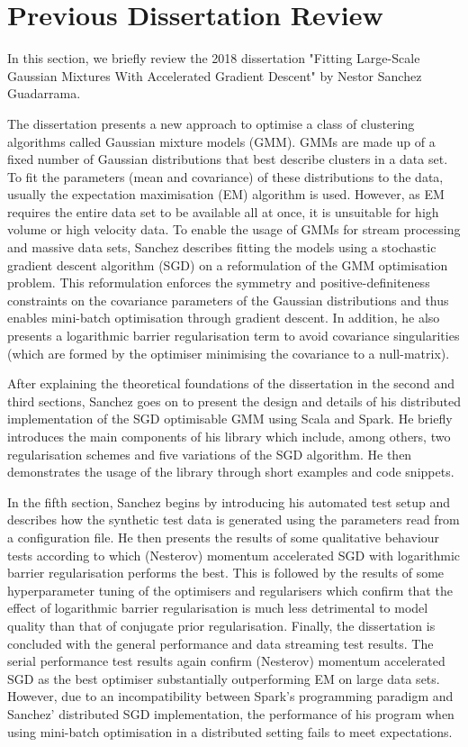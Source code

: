 \documentclass{article}
\begin{document}
\section{Previous Dissertation Review}

In this section, we briefly review the 2018 dissertation "Fitting Large-Scale Gaussian Mixtures With Accelerated Gradient Descent" \cite{sanchez2018} by Nestor Sanchez Guadarrama.

The dissertation presents a new approach to optimise a class of clustering algorithms called Gaussian mixture models (GMM). GMMs are made up of a fixed number of Gaussian distributions that best describe clusters in a data set. To fit the parameters (mean and covariance) of these distributions to the data, usually the expectation maximisation (EM) algorithm is used. However, as EM requires the entire data set to be available all at once, it is unsuitable for high volume or high velocity data. To enable the usage of GMMs for stream processing and massive data sets, Sanchez describes fitting the models using a stochastic gradient descent algorithm (SGD) on a reformulation of the GMM optimisation problem. This reformulation enforces the symmetry and positive-definiteness constraints on the covariance parameters of the Gaussian distributions and thus enables mini-batch optimisation through gradient descent. In addition, he also presents a logarithmic barrier regularisation term to avoid covariance singularities (which are formed by the optimiser minimising the covariance to a null-matrix).

After explaining the theoretical foundations of the dissertation in the second and third sections, Sanchez goes on to present the design and details of his distributed implementation of the SGD optimisable GMM using Scala and Spark. He briefly introduces the main components of his library which include, among others, two regularisation schemes and five variations of the SGD algorithm. He then demonstrates the usage of the library through short examples and code snippets.

In the fifth section, Sanchez begins by introducing his automated test setup and describes how the synthetic test data is generated using the parameters read from a configuration file. He then presents the results of some qualitative behaviour tests according to which (Nesterov) momentum accelerated SGD with logarithmic barrier regularisation performs the best. This is followed by the results of some hyperparameter tuning of the optimisers and regularisers which confirm that the effect of logarithmic barrier regularisation is much less detrimental to model quality than that of conjugate prior regularisation. Finally, the dissertation is concluded with the general performance and data streaming test results. The serial performance test results again confirm (Nesterov) momentum accelerated SGD as the best optimiser substantially outperforming EM on large data sets. However, due to an incompatibility between Spark's programming paradigm and Sanchez' distributed SGD implementation, the performance of his program when using mini-batch optimisation in a distributed setting fails to meet expectations.
\end{document}
